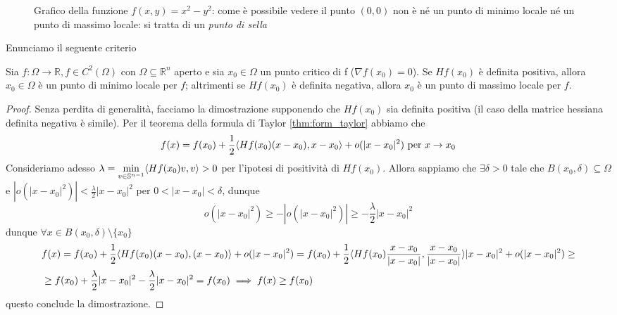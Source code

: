 \documentclass[openany, italian]{book}
\begin{document}
\begin{figure}[htbp]
\centering
{}
\label{fig:punto_sella}
\caption{Grafico della funzione $f(x, y) = x^2 - y^2$: come è possibile vedere il punto $(0, 0)$ non è né un punto di minimo locale né un punto di massimo locale: si tratta di un \emph{punto di sella}}
\end{figure}
Enunciamo il seguente criterio
\begin{theorem}
Sia $f:\Omega \to \mathbb{R}, f \in C^2 (\Omega)$ con $\Omega \subseteq \mathbb{R}^n$ aperto e sia $x_0 \in \Omega$ un punto critico di f ($\nabla f(x_0) = 0$). Se $Hf(x_0)$ è definita positiva, allora $x_0 \in \Omega$ è un punto di minimo locale per $f$; altrimenti se $Hf(x_0)$ è definita negativa, allora $x_0$ è un punto di massimo locale per $f$.
\end{theorem}
\begin{proof} Senza perdita di generalità, facciamo la dimostrazione supponendo che $Hf(x_0)$ sia definita positiva (il caso della matrice hessiana definita negativa è simile). 
Per il teorema della formula di Taylor \ref{thm:form_taylor} abbiamo che
$$
f(x) = f(x_0) + \frac{1}{2} \langle Hf(x_0)(x-x_0), x-x_0 \rangle + o(|x-x_0|^2) \text{ per } x \to x_0
$$
Consideriamo adesso $\lambda = \min\limits_{v \in \mathbb{S}^{n-1}} \langle Hf(x_0)v, v \rangle > 0$ per l'ipotesi di positività di $Hf(x_0)$. Allora sappiamo che $\exists \delta > 0$ tale che $B(x_0, \delta) \subseteq \Omega$ e $|o(|x-x_0|^2)| < \frac{\lambda}{2}|x-x_0|^2$ per $0 < |x-x_0| < \delta$, dunque
$$
o(|x-x_0|^2) \geq -|o(|x-x_0|^2)| \geq -\frac{\lambda}{2}|x-x_0|^2
$$
dunque $\forall x \in B(x_0, \delta) \setminus \{ x_0 \}$
\begin{align*}
&f(x) = f(x_0) + \frac{1}{2}\langle Hf(x_0)(x-x_0), (x-x_0) \rangle + o(|x-x_0|^2) = f(x_0) + \frac{1}{2} \langle Hf(x_0)\frac{x-x_0}{|x-x_0|}, \frac{x-x_0}{|x-x_0|} \rangle|x-x_0|^2 + o(|x-x_0|^2) \geq \\
&\geq f(x_0) + \frac{\lambda}{2}|x-x_0|^2 - \frac{\lambda}{2}|x-x_0|^2 = f(x_0) \implies f(x) \geq f(x_0)
\end{align*}
questo conclude la dimostrazione.
\end{proof}
\end{document}
